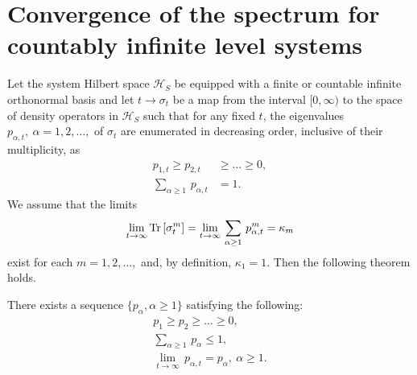 \section{Convergence of the spectrum for countably infinite level systems}\label{chap5-sec9}

Let the system Hilbert space $\mathcal{H}_S$ be equipped with a finite or countable infinite orthonormal basis and let 
$t\rightarrow \sigma_t$ be a map from the interval $[0,\infty)$ to the space of density operators in $\mathcal{H}_S$ such that for any fixed  $t$, the eigenvalues $p_{\alpha, t},\ \alpha=1,2,\ldots,$  of  
$\sigma_t$ are enumerated in decreasing order, inclusive of their multiplicity, as   
\begin{align} 
p_{1,t}\geq p_{2,t}& \geq \ldots \geq 0, \label{chap5-eq9.1}\\
\sum_{\alpha\geq 1}\, p_{\alpha, t}& =1.\label{chap5-eq9.2}
\end{align}
We assume that the limits
\begin{equation}
	\underset{t\rightarrow\infty}{\lim}\, {\rm Tr}\,[\sigma_t^m]=\underset{t\rightarrow\infty}{\lim}\, \sum_{\alpha\geq 1}\, p_{\alpha, t}^m=\kappa_m \label{chap5-eq9.3}
\end{equation} 
exist for each $m=1,2,\ldots,$ and, by definition,  $\kappa_1=1$.  Then the following theorem holds.

\begin{thm} \label{chap5-thm5}
There exists a sequence $\{p_\alpha, \alpha\geq 1\}$ satisfying the following: 
\begin{gather}
	p_1\geq p_2 \geq \ldots \geq 0, \label{chap5-eq9.4}\\
	\sum_{\alpha\geq 1}\, p_{\alpha}\leq 1, \label{chap5-eq9.5}\\
	\underset{t\rightarrow\infty}{\lim}\,p_{\alpha,t}=p_\alpha,\ \alpha\geq 1.\label{chap5-eq9.6}
\end{gather}
\end{thm}

